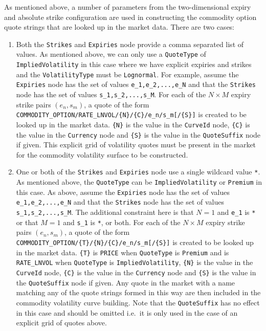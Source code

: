 As mentioned above, a number of parameters from the two-dimensional expiry and absolute strike configuration are used in constructing the commodity option quote strings that are looked up in the market data. There are two cases:
\begin{enumerate}
\item
Both the \lstinline!Strikes! and \lstinline!Expiries! node provide a comma separated list of values. As mentioned above, we can only use a \lstinline!QuoteType! of \lstinline!ImpliedVolatility! in this case where we have explicit expiries and strikes and the \lstinline!VolatilityType! must be \lstinline!Lognormal!. For example, assume the \lstinline!Expiries! node has the set of values \lstinline!e_1,e_2,...,e_N! and that the \lstinline!Strikes! node has the set of values \lstinline!s_1,s_2,...,s_M!. For each of the $N \times M$ expiry strike pairs $(e_n,s_m)$, a quote of the form \lstinline!COMMODITY_OPTION/RATE_LNVOL/{N}/{C}/e_n/s_m[/{S}]! is created to be looked up in the market data. \lstinline!{N}! is the value in the \lstinline!CurveId! node, \lstinline!{C}! is the value in the \lstinline!Currency! node and \lstinline!{S}! is the value in the \lstinline!QuoteSuffix! node if given. This explicit grid of volatility quotes must be present in the market for the commodity volatility surface to be constructed.

\item
One or both of the \lstinline!Strikes! and \lstinline!Expiries! node use a single wildcard value \lstinline!*!. As mentioned above, the \lstinline!QuoteType! can be \lstinline!ImpliedVolatility! or \lstinline!Premium! in this case. As above, assume the \lstinline!Expiries! node has the set of values \lstinline!e_1,e_2,...,e_N! and that the \lstinline!Strikes! node has the set of values \lstinline!s_1,s_2,...,s_M!. The additional constraint here is that $N=1$ and \lstinline!e_1! is \lstinline!*! or that $M=1$ and \lstinline!s_1! is \lstinline!*!, or both. For each of the $N \times M$ expiry strike pairs $(e_n,s_m)$, a quote of the form \lstinline!COMMODITY_OPTION/{T}/{N}/{C}/e_n/s_m[/{S}]! is created to be looked up in the market data. \lstinline!{T}! is \lstinline!PRICE! when \lstinline!QuoteType! is \lstinline!Premium! and is \lstinline!RATE_LNVOL! when \lstinline!QuoteType! is \lstinline!ImpliedVolatility!, \lstinline!{N}! is the value in the \lstinline!CurveId! node, \lstinline!{C}! is the value in the \lstinline!Currency! node and \lstinline!{S}! is the value in the \lstinline!QuoteSuffix! node if given. Any quote in the market with a name matching any of the quote strings formed in this way are then included in the commodity volatility curve building. Note that the \lstinline!QuoteSuffix! has no effect in this case and should be omitted i.e.\ it is only used in the case of an explicit grid of quotes above.
\end{enumerate}

